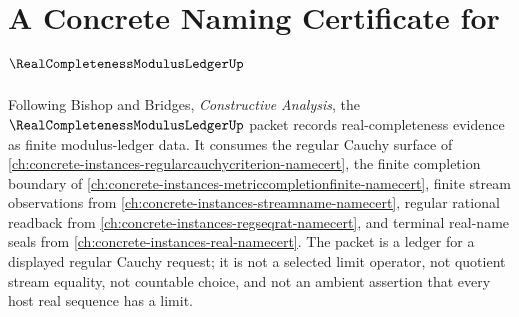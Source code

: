 \chapter{A Concrete Naming Certificate for $\RealCompletenessModulusLedgerUp$}
\label{ch:concrete-instances-real-completeness-modulus-ledger-namecert}

Following Bishop and Bridges, \emph{Constructive Analysis}, the $\RealCompletenessModulusLedgerUp$ packet records real-completeness evidence as finite modulus-ledger data. It consumes the regular Cauchy surface of \autoref{ch:concrete-instances-regularcauchycriterion-namecert}, the finite completion boundary of \autoref{ch:concrete-instances-metriccompletionfinite-namecert}, finite stream observations from \autoref{ch:concrete-instances-streamname-namecert}, regular rational readback from \autoref{ch:concrete-instances-regseqrat-namecert}, and terminal real-name seals from \autoref{ch:concrete-instances-real-namecert}. The packet is a ledger for a displayed regular Cauchy request; it is not a selected limit operator, not quotient stream equality, not countable choice, and not an ambient assertion that every host real sequence has a limit.

